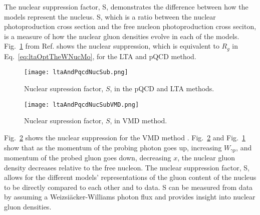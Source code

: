   The nuclear suppression factor, S, demonstrates the difference between how 
    the models represent the nucleus. 
  S, which is a ratio between the nuclear photoproduction cross section and the     
    free nucleon photoproduction cross seciton, is a measure of how the nuclear 
    gluon densities evolve in each of the models. 
  Fig.~\ref{fig:ltaAndPqcdNucSub} from Ref.\cite{lta2013.05} shows the nuclear 
    suppression, which is equivalent to $R_g$ in Eq.~\ref{eq:ltaOptTheWNucMo}, 
    for the LTA and pQCD method.
  \begin{figure}[h] 
    \begin{center}
      \texttt{[image: ltaAndPqcdNucSub.png]}
    \end{center}
    \caption{ \label{fig:ltaAndPqcdNucSub} Nuclear supression factor, $S$, in the pQCD and LTA methods.}
  \end{figure}
  \begin{figure}
    \begin{center}
      \texttt{[image: ltaAndPqcdNucSubVMD.png]}
    \end{center}
    \caption{ \label{fig:ltaAndPqcdNucSubVMD} Nuclear supression factor, $S$, in VMD method.}
  \end{figure}
  Fig.~\ref{fig:ltaAndPqcdNucSubVMD} shows the nuclear suppression for the VMD 
    method \cite{lta2013.05}. 
  Fig.~\ref{fig:ltaAndPqcdNucSubVMD} and Fig.~\ref{fig:ltaAndPqcdNucSub} show that 
    as the momentum of the probing photon goes up, increasing $W_{\gamma p}$, 
    and momentum of the probed gluon goes down, decreasing $x$, 
    the nuclear gluon density decreases relative to the free nucleon. 
  The nuclear suppression factor, S, allows for the different models' 
    representations of the gluon content of the nucleus to be directly compared
    to each other and to data. 
  S can be measured from data by assuming a Weizsi\"{a}cker-Williams photon flux and 
    provides insight into nuclear gluon densities. 
